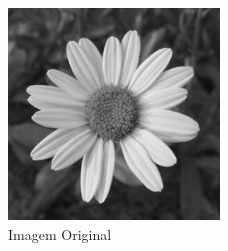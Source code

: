 \documentclass[a4paper]{report}
\begin{document}
\begin{figure}[H]
    \centering
        \includegraphics[width=0.5\textwidth]{images/flower.jpg}
        \caption{Imagem Original}
\end{figure}
\end{document}
